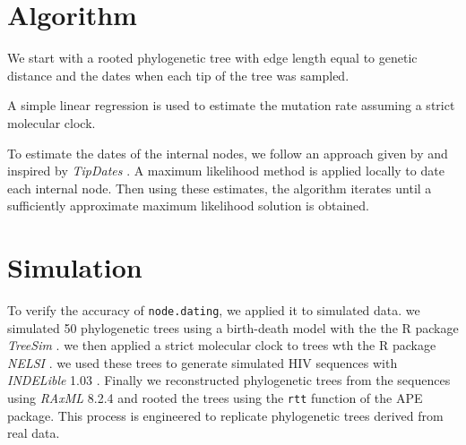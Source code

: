 \documentclass[12pt]{article}
\newcommand{\code}[1]{{\tt #1}}
\begin{document}


\section*{Algorithm} \label{sec:alg}
We start with a rooted phylogenetic tree with edge length equal to genetic distance and the dates when each tip of the tree was sampled.

A simple linear regression is used to estimate the mutation rate assuming a strict molecular clock.

To estimate the dates of the internal nodes, we follow an approach given by \cite{Felsenstein81} and inspired by \emph{TipDates} \citep{TipDates}.
A maximum likelihood method is applied locally to date each internal node.
Then using these estimates, the algorithm iterates until a sufficiently approximate maximum likelihood solution is obtained.


\section*{Simulation} \label{sec:sim}
To verify the accuracy of \code{node.dating}, we applied it to simulated data.
we simulated 50 phylogenetic trees using a birth-death model with the the R package \emph{TreeSim} \citep{TreeSim}.
we then applied a strict molecular clock to trees wth the R package \emph{NELSI} \citep{NELSI}.
we used these trees to generate simulated HIV sequences with \emph{INDELible} 1.03 \citep{Indelible09}.
Finally we reconstructed phylogenetic trees from the sequences using \emph{RAxML} 8.2.4 \citep{Raxml14} and rooted the trees using the \code{rtt} function of the APE package.
This process is engineered to replicate phylogenetic trees derived from real data.
\end{document}

